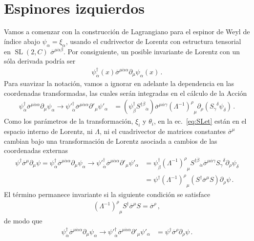 \section{Espinores izquierdos}
\begin{frame}
Vamos a comenzar con la construcción de Lagrangiano para el espinor de Weyl de índice abajo
$\psi_{\alpha}=\xi_{\alpha}$, usando el cudrivector de Lorentz con estructura tensorial en $\operatorname{SL}(2,C)$ $\overline{\sigma}^{\mu\dot{\alpha}\beta}$.
Por consiguiente, un posible invariante de Lorentz con un sóla derivada podría ser
 \begin{align}
   {\psi}^{\dagger}_{\dot{\alpha}}(x)\overline{\sigma}^{\mu\dot{\alpha}\alpha}\partial_\mu\psi_{\alpha}(x)\,.
\end{align}
Para suavizar la notación, vamos a ignorar en adelante la dependencia en las coordenadas transformadas, las cuales serán integradas en el cálculo de la Acción
\begin{align}
     {\psi}^{\dagger}_{\dot{\alpha}}\overline{\sigma}^{\mu\dot{\alpha}\alpha}\partial_\mu\psi_{\alpha}\to  {\psi'}^{\dagger}_{\dot{\alpha}}\overline{\sigma}^{\mu\dot{\alpha}\alpha}\partial'_\mu\psi'_{\alpha}
&=
\left( {\psi}^{\dagger}_{\dot{\beta}}  {S^{\dagger\dot{\beta}}}_{\dot{\alpha}} \right)\overline{\sigma}^{\mu\dot{\alpha\gamma}}{\left(\Lambda^{-1}\right)^\rho}_\mu\partial_\rho \left( {S_{\gamma}}^{\delta}\psi_\delta \right)\,.
 \end{align} 
 Como los parámetros de la transformación, $\xi_i$ y $\theta_i$, en la ec.~\eqref{eq:SLet} están en el espacio interno de Lorentz, 
 ni $\Lambda$, ni el cuadrivector de matrices constantes $\overline{\sigma}^{\mu}$ cambian bajo una transformación de Lorentz asociada a cambios de las coordenadas externas
\begin{align}
  {\psi}^{\dagger}\overline{\sigma}^\mu\partial_\mu\psi
  =    {\psi}^{\dagger}_{\dot{\alpha}}\overline{\sigma}^{\mu\dot{\alpha}\alpha}\partial_\mu\psi_{\alpha}\to  {\psi'}^{\dagger}_{\dot{\alpha}}\overline{\sigma}^{\mu\dot{\alpha}\alpha}\partial'_\mu\psi'_{\alpha}&=
{\psi}^{\dagger}_{\dot{\beta}}{\left(\Lambda^{-1}\right)^\rho}_\mu {S^{\dagger\dot{\beta}}}_{\dot{\alpha}}\overline{\sigma}^{\mu\dot{\alpha\gamma}}{S_{\gamma}}^{\delta} \partial_\rho  \psi_\delta \nonumber\\
&=\psi^\dagger {\left(\Lambda^{-1}\right)^\rho}_\mu \left(S^\dagger \overline{\sigma}^\mu S\right)\partial_\rho\psi\,.
\end{align}
El término permanece invariante si la siguiente condición se satisface
\begin{align}
  \label{eq:preidentidadlag}
 {\left(\Lambda^{-1}\right)^\rho}_\mu  S^{\dagger}\overline{\sigma}^\mu S=\overline{\sigma}^\rho\,,
\end{align}
de modo que
\begin{align}
{\psi}^{\dagger}_{\dot{\alpha}}\overline{\sigma}^{\mu\dot{\alpha}\alpha}\partial_\mu\psi_{\alpha}\to  {\psi'}^{\dagger}_{\dot{\alpha}}\overline{\sigma}^{\mu\dot{\alpha}\alpha}\partial'_\mu\psi'_{\alpha}&=\psi^{\dagger}\overline{\sigma}^\rho\partial_\rho\psi\,.
\end{align}


\end{frame}
